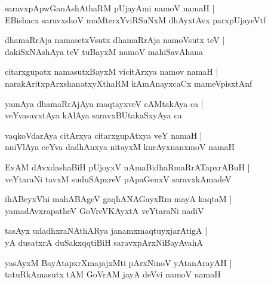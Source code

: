 \documentclass[twoside,12pt,openright]{book}
\newcounter{shloka}[chapter]
\begin{document}
\begin{shloka}%
saravxpApwGanAshAthaRM pUjayAmi namoV namaH |\\
EBishacx saravxshoV maMterxYviRSuNxM dhAyxtAvx parxpUjayeVtf 
\end{shloka}

\begin{shloka}%
dhamaRrAja namasetxVsutx dhamaRrAja namoVsutx teV |\\
dakiSxNAshAya teV tuBayxM namoV mahiSavAhana
\end{shloka}

\begin{shloka}%
citarxgupatx namasutxBayxM vicitArxya namov namaH |\\
narakAritxpArxshanatxyXthaRM kAmAnayxcaCx mameVpisxtAnf
\end{shloka}

\begin{shloka}%
yamAya dhamaRrAjAya maqtayxveV cAMtakAya ca |\\
veYvasavxtAya kAlAya saravxBUtakaSxyAya ca 
\end{shloka}

\begin{shloka}%
vaqkoVdarAya citArxya citarxgupAtxya veY namaH |\\
nniVlAya ceYva dadhAnxya nitayxM kurAyxnanxmoV namaH 
\end{shloka}

\begin{shloka}%
EvAM dAvxdashaBiH pUjoyxV nAmaBidhaRmaRrATapxrABuH |\\
veYtaraNi tavxM suduSApxreV pApaGenxV saravxkAmadeV
\end{shloka}

\begin{shloka}%
ihABeyxVhi mahABAgeV gaqhANAGayxRm mayA kaqtaM |\\
yamadAvxrapatheV GoVreVKAyxtA veYtaraNi nadiV 
\end{shloka}

\begin{shloka}%
tasAyx udadhxraNAthARya janamxmaqtuyxjarAtigA |\\
yA dusatxrA duSakxqqtiBiH saravxpArxNiBayAvahA
\end{shloka}

\begin{shloka}%
yasAyxM BayAtapxrXmajajxMti pArxNinoV yAtanArayAH |\\
tatuRkAmasutx tAM GoVrAM jayA deVvi namoV namaH 
\end{shloka}
\end{document}

